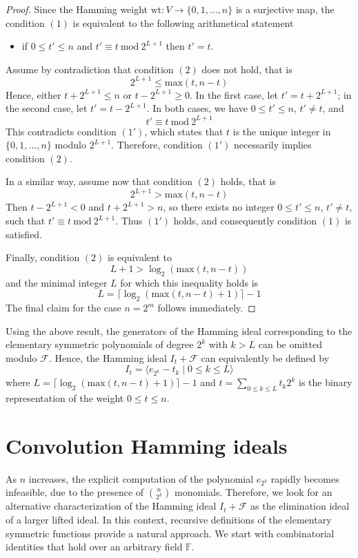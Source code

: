 \documentclass{amsart}
\def\FF{{\mathbb F}}
\def\wt{{\mathrm{wt}}}
\def\mod{{\mathrm{mod}}}
\def\cF{{\mathcal{F}}}
\def\max{{\mathrm{max}}}
\begin{document}
\begin{proof}
Since the Hamming weight $\wt:V \to \{0,1,\dots,n\}$ is a surjective map,
the condition $(1)$ is equivalent to the following arithmetical statement
\begin{itemize}
\vspace{2pt}
\item[$(1')$] if $0\leq t'\leq n$ and $t' \equiv t\ \mod\ 2^{L+1}$ then $t' = t$.
\vspace{2pt}
\end{itemize}
Assume by contradiction that condition $(2)$ does not hold, that is
\[
2^{L+1} \leq \max(t,n-t)
\]
Hence, either $t + 2^{L+1} \leq n$ or $t - 2^{L+1} \geq 0$.
In the first case, let $t' = t + 2^{L+1}$; in the second case, let
$t' = t - 2^{L+1}$. In both cases, we have $0\leq t'\leq n$, $t'\neq t$,
and
\[
t' \equiv t\ \mod\ 2^{L+1}
\]
This contradicts condition $(1')$, which states that $t$ is the unique
integer in $\{0,1,\ldots,n\}$ modulo $2^{L+1}$. Therefore, condition $(1')$ necessarily
implies condition $(2)$.

In a similar way, assume now that condition $(2)$ holds, that is
\[
2^{L+1} > \max(t,n-t)
\]
Then $t - 2^{L+1} < 0$ and $t + 2^{L+1} > n$, so there exists no integer
$0\leq t'\leq n$, $t'\neq t$, such that $t' \equiv t\ \mod\ 2^{L+1}$.
Thus $(1')$ holds, and consequently condition $(1)$ is satisfied.

Finally, condition $(2)$ is equivalent to
\[
L+1 > \log_2( \max(t,n-t) )
\]
and the minimal integer $L$ for which this inequality holds is
\[
L = \lceil \log_2(\max(t,n-t)+1) \rceil - 1
\]
The final claim for the case $n = 2^m$ follows immediately.
\end{proof}

Using the above result, the generators of the Hamming ideal corresponding
to the elementary symmetric polynomials of degree $2^k$ with $k > L$ can be
omitted modulo $\cF$. Hence, the Hamming ideal $I_t + \cF$ can equivalently
be defined by
\[
I_t = \langle e_{2^k} - t_k \mid 0\leq k\leq L \rangle
\]
where $L = \lceil \log_2( \max(t,n-t) + 1 ) \rceil - 1$ and $t = \sum_{0\leq k\leq L} t_k 2^k$
is the binary representation of the weight $0\leq t\leq n$.

\section{Convolution Hamming ideals}

As $n$ increases, the explicit computation of the polynomial $e_{2^k}$ rapidly becomes
infeasible, due to the presence of $\binom{n}{2^k}$ monomials.
Therefore, we look for an alternative characterization of the Hamming ideal $I_t + \cF$
as the elimination ideal of a larger lifted ideal. In this context, recursive definitions
of the elementary symmetric functions provide a natural approach. We start with combinatorial
identities that hold over an arbitrary field $\FF$.
\end{document}
